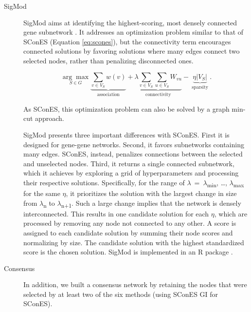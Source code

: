 \documentclass[twocolumn, 11pt]{article}
\begin{document}
\begin{description}
\item[{SigMod}] SigMod aims at identifying the highest-scoring, most densely connected gene subnetwork \cite{liu_sigmod:_2017}. It addresses an optimization problem similar to that of SConES (Equation \ref{eq:scones}), but the connectivity term encourages connected solutions by favoring solutions where many edges connect two selected nodes, rather than penalizing disconnected ones.  

\begin{equation*}
\underset{S \in G}{\arg \max } \underbrace{\sum_{v \in V_S} w(v)}_{\text { association }} + \underbrace{\lambda \sum_{v \in V_S} \sum_{u \in V_S} W_{vu} }_{\text { connectivity }} -\underbrace{\eta \lvert V_S \rvert }_{\text { sparsity }}.
\end{equation*}

As SConES, this optimization problem can also be solved by a graph min-cut approach. 

SigMod presents three important differences with SConES. First it is designed for gene-gene networks. Second, it favors subnetworks containing many edges. SConES, instead, penalizes connections between the selected and unselected nodes. Third, it returns a single connected subnetwork, which it achieves by exploring a grid of hyperparameters and processing their respective solutions. Specifically, for the range of \(\lambda\)~=~\(\lambda\)\textsubscript{min}, \dots{}, \(\lambda\)\textsubscript{max} for the same \(\eta\), it prioritizes the solution with the largest change in size from \(\lambda\)\textsubscript{n} to \(\lambda\)\textsubscript{n+1}. Such a large change implies that the network is densely interconnected. This results in one candidate solution for each \(\eta\), which are processed by removing any node not connected to any other. A score is assigned to each candidate solution by summing their node scores and normalizing by size. The candidate solution with the highest standardized score is the chosen solution. SigMod is implemented in an R package \cite{sigmod}.
\end{description}

\begin{description}
\item[{Consensus}] In addition, we built a consensus network by retaining the nodes that were selected by at least two of the six methods (using SConES GI for SConES).
\end{description}
\end{document}
